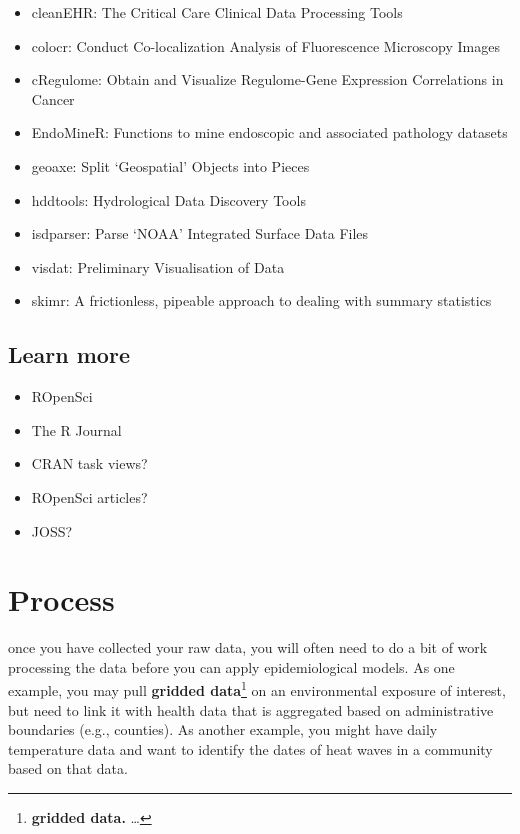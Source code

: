 \documentclass[]{tufte-book}
\providecommand{\tightlist}{%
  \setlength{\itemsep}{0pt}\setlength{\parskip}{0pt}}
\begin{document}
\begin{itemize}
\tightlist
\item
  cleanEHR: The Critical Care Clinical Data Processing Tools
\item
  colocr: Conduct Co-localization Analysis of Fluorescence Microscopy Images
\item
  cRegulome: Obtain and Visualize Regulome-Gene Expression Correlations in Cancer
\item
  EndoMineR: Functions to mine endoscopic and associated pathology datasets
\item
  geoaxe: Split `Geospatial' Objects into Pieces
\item
  hddtools: Hydrological Data Discovery Tools
\item
  isdparser: Parse `NOAA' Integrated Surface Data Files
\item
  visdat: Preliminary Visualisation of Data
\item
  skimr: A frictionless, pipeable approach to dealing with summary statistics
\end{itemize}

\hypertarget{learn-more-3}{%
\section{Learn more}\label{learn-more-3}}

\begin{itemize}
\tightlist
\item
  ROpenSci
\item
  The R Journal
\item
  CRAN task views?
\item
  ROpenSci articles?
\item
  JOSS?
\end{itemize}

\hypertarget{process}{%
\chapter{Process}\label{process}}

 once you have collected your raw data,
you will often need to do a bit of work processing the data before you can apply epidemiological
models. As one example, you may pull \textbf{gridded data}\footnote{\textbf{gridded data.} \ldots{}} on an
environmental exposure of interest, but need to link it with health data that is aggregated
based on administrative boundaries (e.g., counties). As another example, you might have
daily temperature data and want to identify the dates of heat waves in a community based on
that data.
\end{document}
